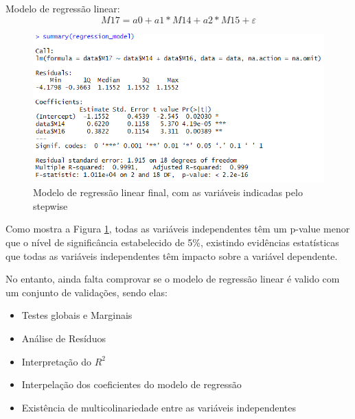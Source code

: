 \documentclass[%
 aip,
cp,  %
 amsmath,amssymb,%
 reprint,%
]{revtex4-2}
\begin{document}
  Modelo de regressão linear: \[ M17 = a0 + a1*M14 + a2*M15 + \varepsilon\]

  \begin{figure}
      \centering
      \includegraphics[width=0.6\linewidth]{imagens//questao4/regressaolinearFinalPergunta4.png}
      \caption{Modelo de regressão linear final, com as variáveis indicadas pelo stepwise}
      \label{fig:regressaoLinearFinalPergunta4}
  \end{figure}
Como mostra a Figura \ref{fig:regressaoLinearFinalPergunta4},  todas as variáveis independentes têm um p-value menor que o nível de significância estabelecido de 5\%, existindo evidências estatísticas que todas as variáveis independentes têm impacto sobre a variável dependente.

No entanto, ainda falta comprovar se o modelo de regressão linear é valido com um conjunto de validações, sendo elas:

\begin{itemize}
    \item Testes globais e Marginais
    \item Análise de Resíduos
    \item Interpretação do $R^2$ %
    \item Interpelação dos coeficientes do modelo de regressão
    \item Existência de multicolinariedade entre as variáveis independentes
\end{itemize}


\hfill \break
\end{document}
